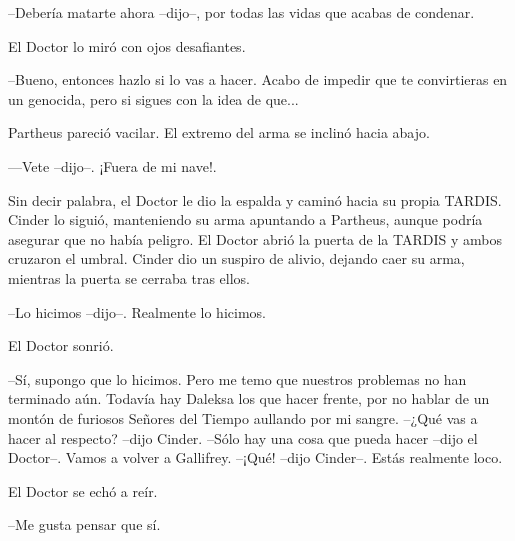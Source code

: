 --Debería matarte ahora --dijo--, por todas las vidas que acabas de condenar.

El Doctor lo miró con ojos desafiantes. 

--Bueno, entonces hazlo si lo vas a hacer. Acabo de impedir que te convirtieras en un genocida, pero si sigues con la idea de que...

Partheus pareció vacilar. El extremo del arma se inclinó hacia abajo. 

---Vete --dijo--. ¡Fuera de mi nave!.

Sin decir palabra, el Doctor le dio la espalda y caminó hacia su propia TARDIS. Cinder lo siguió, manteniendo su arma apuntando a Partheus, aunque podría asegurar que no había peligro.
El Doctor abrió la puerta de la TARDIS y ambos cruzaron el umbral.
Cinder dio un suspiro de alivio, dejando caer su arma, mientras la puerta se cerraba tras ellos. 

--Lo hicimos --dijo--. Realmente lo hicimos.

El Doctor sonrió. 

--Sí, supongo que lo hicimos. Pero me temo que nuestros problemas no han terminado aún. Todavía hay Daleksa los que hacer frente, por no hablar de un montón de furiosos Señores del Tiempo aullando por mi sangre.
--¿Qué vas a hacer al respecto? --dijo Cinder.
--Sólo hay una cosa que pueda hacer --dijo el Doctor--. Vamos a volver a Gallifrey.
--¡Qué! --dijo Cinder--. Estás realmente loco.

El Doctor se echó a reír. 

--Me gusta pensar que sí.


